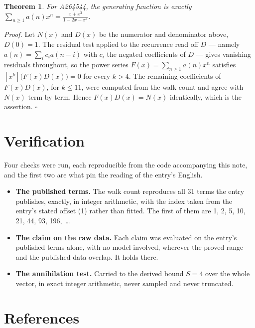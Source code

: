\documentclass[11pt]{article}
\newtheorem{theorem}{Theorem}
\theoremstyle{definition}
\begin{document}
\begin{theorem} For A264544, the generating function is exactly $\sum_{n\ge 1} a(n)x^n = \frac{x + x^{3}}{1 - 2x - x^{4}}$.\end{theorem}

{\itshape Proof.} Let $N(x)$ and $D(x)$ be the numerator and denominator above, $D(0)=1$. The residual test applied to the recurrence read off $D$ --- namely $a(n) = \sum_i c_i a(n-i)$ with $c_i$ the negated coefficients of $D$ --- gives vanishing residuals throughout, so the power series $F(x)=\sum_{n\ge 1}a(n)x^n$ satisfies $[x^k]\bigl(F(x)D(x)\bigr) = 0$ for every $k > 4$. The remaining coefficients of $F(x)D(x)$, for $k \le 11$, were computed from the walk count and agree with $N(x)$ term by term. Hence $F(x)D(x) = N(x)$ identically, which is the assertion. $\square$

\section{Verification}

Four checks were run, each reproducible from the code accompanying this note, and the first two are what pin the reading of the entry's English.

\begin{itemize}

\item {\bfseries The published terms.} The walk count reproduces all 31 terms the entry publishes, exactly, in integer arithmetic, with the index taken from the entry's stated offset (1) rather than fitted. The first of them are 1, 2, 5, 10, 21, 44, 93, 196,~\dots

\item {\bfseries The claim on the raw data.} Each claim was evaluated on the entry's published terms alone, with no model involved, wherever the proved range and the published data overlap. It holds there.

\item {\bfseries The annihilation test.} Carried to the derived bound $S = 4$ over the whole vector, in exact integer arithmetic, never sampled and never truncated.

\end{itemize}

\section{References}
\end{document}
